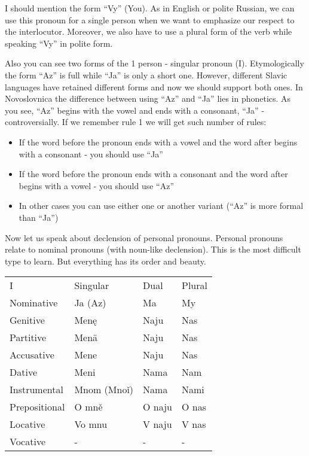 I should mention the form “Vy” (You). As in English or polite Russian, we can use this pronoun for a single person when we want to emphasize our respect to the interlocutor. Moreover, we also have to use a plural form of the verb while speaking “Vy” in polite form.

Also you can see two forms of the 1 person - singular pronoun (I). Etymologically the form “Az” is full while “Ja” is only a short one. However, different Slavic languages have retained different forms and now we should support both ones. In Novoslovnica the difference between using “Az” and “Ja” lies in phonetics. As you see, “Az” begins with the vowel and ends with a consonant, “Ja” - controversially. If we remember rule 1 we will get such number of rules:

\begin{itemize}
	\item If the word before the pronoun ends with a vowel and the word after begins with a consonant - you should use “Ja”
	\item If the word before the pronoun ends with a consonant and the word after begins with a vowel - you should use “Az”
	\item In other cases you can use either one or another variant (“Az” is more formal than “Ja”)
\end{itemize}

Now let us speak about declension of personal pronouns. Personal pronouns relate to nominal pronouns (with noun-like declension). This is the most difficult type to learn. But everything has its order and beauty.

\begin{table}[!htb]
	\begin{tabular}{llll}
		I & Singular & Dual & Plural \\
		Nominative & Ja (Az) & Ma & My \\
		Genitive & Menę & Naju & Nas \\
		Partitive & Menä & Naju & Nas \\
		Accusative & Mene & Naju & Nas \\
		Dative & Meni & Nama & Nam \\
		Instrumental & Mnom (Mnoǐ) & Nama & Nami \\
		Prepositional & O mně & O naju & O nas \\
		Locative & Vo mnu & V naju & V nas \\
		Vocative & - & - & -
	\end{tabular}
\end{table}

